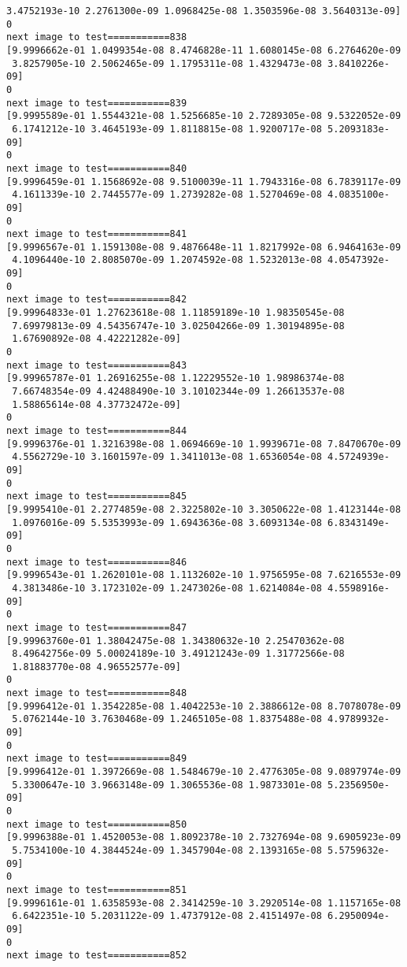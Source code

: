 \documentclass[11pt]{article}
\begin{document}
\begin{Verbatim}[commandchars=\\\{\}]
 3.4752193e-10 2.2761300e-09 1.0968425e-08 1.3503596e-08 3.5640313e-09]
0
next image to test===========838
[9.9996662e-01 1.0499354e-08 8.4746828e-11 1.6080145e-08 6.2764620e-09
 3.8257905e-10 2.5062465e-09 1.1795311e-08 1.4329473e-08 3.8410226e-09]
0
next image to test===========839
[9.9995589e-01 1.5544321e-08 1.5256685e-10 2.7289305e-08 9.5322052e-09
 6.1741212e-10 3.4645193e-09 1.8118815e-08 1.9200717e-08 5.2093183e-09]
0
next image to test===========840
[9.9996459e-01 1.1568692e-08 9.5100039e-11 1.7943316e-08 6.7839117e-09
 4.1611339e-10 2.7445577e-09 1.2739282e-08 1.5270469e-08 4.0835100e-09]
0
next image to test===========841
[9.9996567e-01 1.1591308e-08 9.4876648e-11 1.8217992e-08 6.9464163e-09
 4.1096440e-10 2.8085070e-09 1.2074592e-08 1.5232013e-08 4.0547392e-09]
0
next image to test===========842
[9.99964833e-01 1.27623618e-08 1.11859189e-10 1.98350545e-08
 7.69979813e-09 4.54356747e-10 3.02504266e-09 1.30194895e-08
 1.67690892e-08 4.42221282e-09]
0
next image to test===========843
[9.99965787e-01 1.26916255e-08 1.12229552e-10 1.98986374e-08
 7.66748354e-09 4.42488490e-10 3.10102344e-09 1.26613537e-08
 1.58865614e-08 4.37732472e-09]
0
next image to test===========844
[9.9996376e-01 1.3216398e-08 1.0694669e-10 1.9939671e-08 7.8470670e-09
 4.5562729e-10 3.1601597e-09 1.3411013e-08 1.6536054e-08 4.5724939e-09]
0
next image to test===========845
[9.9995410e-01 2.2774859e-08 2.3225802e-10 3.3050622e-08 1.4123144e-08
 1.0976016e-09 5.5353993e-09 1.6943636e-08 3.6093134e-08 6.8343149e-09]
0
next image to test===========846
[9.9996543e-01 1.2620101e-08 1.1132602e-10 1.9756595e-08 7.6216553e-09
 4.3813486e-10 3.1723102e-09 1.2473026e-08 1.6214084e-08 4.5598916e-09]
0
next image to test===========847
[9.99963760e-01 1.38042475e-08 1.34380632e-10 2.25470362e-08
 8.49642756e-09 5.00024189e-10 3.49121243e-09 1.31772566e-08
 1.81883770e-08 4.96552577e-09]
0
next image to test===========848
[9.9996412e-01 1.3542285e-08 1.4042253e-10 2.3886612e-08 8.7078078e-09
 5.0762144e-10 3.7630468e-09 1.2465105e-08 1.8375488e-08 4.9789932e-09]
0
next image to test===========849
[9.9996412e-01 1.3972669e-08 1.5484679e-10 2.4776305e-08 9.0897974e-09
 5.3300647e-10 3.9663148e-09 1.3065536e-08 1.9873301e-08 5.2356950e-09]
0
next image to test===========850
[9.9996388e-01 1.4520053e-08 1.8092378e-10 2.7327694e-08 9.6905923e-09
 5.7534100e-10 4.3844524e-09 1.3457904e-08 2.1393165e-08 5.5759632e-09]
0
next image to test===========851
[9.9996161e-01 1.6358593e-08 2.3414259e-10 3.2920514e-08 1.1157165e-08
 6.6422351e-10 5.2031122e-09 1.4737912e-08 2.4151497e-08 6.2950094e-09]
0
next image to test===========852

\end{Verbatim}
\end{document}
